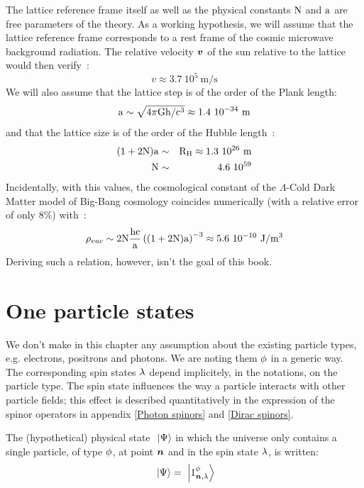 \documentclass[10pt,a4paper,twoside,openany]{book}
\begin{document}
The lattice reference frame itself as well as the physical constants $\N$ and $\a$ are free parameters of the theory. As a working hypothesis, we will assume that the lattice reference frame corresponds to a rest frame of the cosmic microwave background radiation. The relative velocity $\sv v$ of the sun relative to the lattice would then verify~\cite{Kogut1993}:
\begin{equation*}
v \approx 3.7~10^5\ \mathrm m / \mathrm s
\end{equation*}
We will also assume that the lattice step is of the order of the Plank length:
\begin{equation*}
\a \sim \sqrt{4\pi\G \h/\c^3}\approx1.4~10^{-34}\ \mathrm m
\end{equation*}
and that the lattice size is of the order of the Hubble length~\cite{Freedman2001}:
\begin{eqnarray*}
(1+2 \N) \a & \sim & \RH\approx1.3\ 10^{26}\ \mathrm m\\
\N & \sim & 4.6~10^{59}
\end{eqnarray*}
Incidentally, with this values, the cosmological constant of the $\Lambda$-Cold Dark Matter model of Big-Bang cosmology coincides numerically (with a relative error of only 8\%) with~\cite{Komatsu2010}:
\begin{equation*}
\rho_{vac} \sim 2 \N \frac{\h \c}{\a} \left( ( 1 + 2 \N ) \a \right)^{-3} \approx 5.6~10^{-10}\ \mathrm J / \mathrm m^3
\end{equation*}
Deriving such a relation, however, isn't the goal of this book.

\section{One particle states}

 We don't make in this chapter any assumption about the existing particle types, e.g. electrons, positrons and photons. We are noting them $\pt$ in a generic way. The corresponding spin states $\sp$ depend implicitely, in the notations, on the particle type. The spin state influences the way a particle interacts with other particle fields; this effect is described quantitatively in the expression of the spinor operators in appendix \ref{Photon spinors} and \ref{Dirac spinors}.

 The (hypothetical) physical state $\ket{\Psi}$ in which the universe only contains a single particle, of type $\pt$, at point $\n$ and in the spin state $\sp$, is written:
\begin{equation*}
\ket{\Psi} = \ketX 1 \pt \n \sp
\end{equation*}
\end{document}
